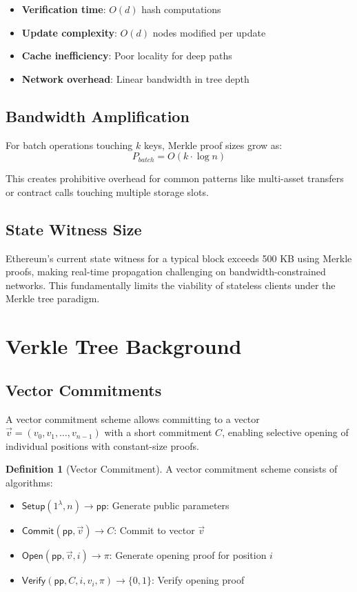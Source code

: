 \documentclass[11pt,a4paper]{article}
\theoremstyle{definition}
\newtheorem{definition}{Definition}
\begin{document}
\begin{itemize}
    \item \textbf{Verification time}: $O(d)$ hash computations
    \item \textbf{Update complexity}: $O(d)$ nodes modified per update
    \item \textbf{Cache inefficiency}: Poor locality for deep paths
    \item \textbf{Network overhead}: Linear bandwidth in tree depth
\end{itemize}

\subsection{Bandwidth Amplification}

For batch operations touching $k$ keys, Merkle proof sizes grow as:
\begin{equation}
    P_{batch} = O(k \cdot \log n)
\end{equation}

This creates prohibitive overhead for common patterns like multi-asset transfers or contract calls touching multiple storage slots.

\subsection{State Witness Size}

Ethereum's current state witness for a typical block exceeds 500 KB using Merkle proofs, making real-time propagation challenging on bandwidth-constrained networks. This fundamentally limits the viability of stateless clients under the Merkle tree paradigm.

\section{Verkle Tree Background}

\subsection{Vector Commitments}

A vector commitment scheme allows committing to a vector $\vec{v} = (v_0, v_1, \ldots, v_{n-1})$ with a short commitment $C$, enabling selective opening of individual positions with constant-size proofs.

\begin{definition}[Vector Commitment]
A vector commitment scheme consists of algorithms:
\begin{itemize}
    \item $\mathsf{Setup}(1^\lambda, n) \rightarrow \mathsf{pp}$: Generate public parameters
    \item $\mathsf{Commit}(\mathsf{pp}, \vec{v}) \rightarrow C$: Commit to vector $\vec{v}$
    \item $\mathsf{Open}(\mathsf{pp}, \vec{v}, i) \rightarrow \pi$: Generate opening proof for position $i$
    \item $\mathsf{Verify}(\mathsf{pp}, C, i, v_i, \pi) \rightarrow \{0,1\}$: Verify opening proof
\end{itemize}
\end{definition}
\end{document}
